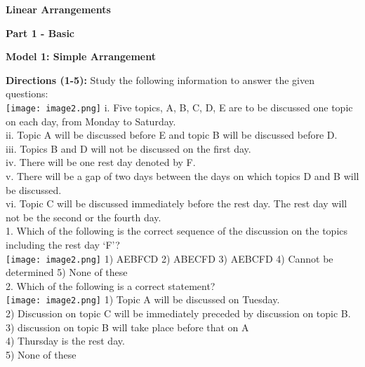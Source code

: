 \documentclass[
]{article}
\author{}
\date{}
\begin{document}
	
 

\begin{center}
	{\Large \textbf{Linear Arrangements \\}}
\end{center}

{\large \textbf{ Part 1 - Basic \\}}

\textbf{Model 1: Simple Arrangement}

\textbf{Directions (1-5):} Study the following information to answer the given questions:\\
\texttt{[image: image2.png]}
i. Five topics, A, B, C, D, E are to be discussed one topic on each day, from Monday to
Saturday.\\
ii. Topic A will be discussed before E and topic B will be discussed before D.\\
iii. Topics B and D will not be discussed on the first day.\\
iv. There will be one rest day denoted by F.\\
v. There will be a gap of two days between the days on which topics D and B will be
discussed.\\
vi. Topic C will be discussed immediately before the rest day. The rest day will not be the
second or the fourth day.\\

1. Which of the following is the correct sequence of the discussion on the topics including the
rest day ‘F’?\\
\texttt{[image: image2.png]}
1) AEBFCD \hspace{2mm}2) ABECFD \hspace{2mm}3) AEBCFD
\hspace{2mm}4) Cannot be determined \hspace{2mm}5) None of these\\

2. Which of the following is a correct statement?\\
\texttt{[image: image2.png]}
1) Topic A will be discussed on Tuesday.\\
2) Discussion on topic C will be immediately preceded by discussion on topic B.\\
3) discussion on topic B will take place before that on A\\
4) Thursday is the rest day.\\
5) None of these\\
\end{document}
